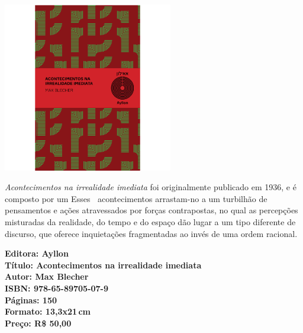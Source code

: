 \begin{center}
\hspace*{.5cm}\includegraphics[width=74mm]{./CAPAS/AYLLON_BLECHER.jpg}
\end{center}
\hspace*{-7cm}\hrulefill\hspace*{-7cm}
\medskip

\noindent{}\textit{Acontecimentos na irrealidade imediata} foi originalmente publicado em 1936, e é composto por um  Esses􏰃􏰀 acontecimentos arrastam-no a um turbilhão de pensamentos e ações atravessados por forças contrapostas, no qual as percepções misturadas da realidade, do tempo e do espaço dão lugar a um tipo diferente de discurso, que oferece inquietações fragmentadas ao invés de uma ordem racional.

\vfill
\noindent\begin{minipage}[c]{1\linewidth}
{\small\textbf{
\hspace*{-.1cm}Editora: Ayllon\\
Título: Acontecimentos na irrealidade imediata\\
Autor: Max Blecher\\ 
ISBN: 978-65-89705-07-9\\
Páginas: 150\\
Formato: 13,3x21\,cm\\
Preço: R\$ 50,00\\
}}
\end{minipage}
\pagebreak

